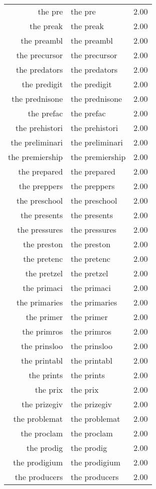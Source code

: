 \begin{table}[ht]
\begin{tabular}{rlr}
  the pre & the pre & 2.00 \\ 
  the preak & the preak & 2.00 \\ 
  the preambl & the preambl & 2.00 \\ 
  the precursor & the precursor & 2.00 \\ 
  the predators & the predators & 2.00 \\ 
  the predigit & the predigit & 2.00 \\ 
  the prednisone & the prednisone & 2.00 \\ 
  the prefac & the prefac & 2.00 \\ 
  the prehistori & the prehistori & 2.00 \\ 
  the preliminari & the preliminari & 2.00 \\ 
  the premiership & the premiership & 2.00 \\ 
  the prepared & the prepared & 2.00 \\ 
  the preppers & the preppers & 2.00 \\ 
  the preschool & the preschool & 2.00 \\ 
  the presents & the presents & 2.00 \\ 
  the pressures & the pressures & 2.00 \\ 
  the preston & the preston & 2.00 \\ 
  the pretenc & the pretenc & 2.00 \\ 
  the pretzel & the pretzel & 2.00 \\ 
  the primaci & the primaci & 2.00 \\ 
  the primaries & the primaries & 2.00 \\ 
  the primer & the primer & 2.00 \\ 
  the primros & the primros & 2.00 \\ 
  the prinsloo & the prinsloo & 2.00 \\ 
  the printabl & the printabl & 2.00 \\ 
  the prints & the prints & 2.00 \\ 
  the prix & the prix & 2.00 \\ 
  the prizegiv & the prizegiv & 2.00 \\ 
  the problemat & the problemat & 2.00 \\ 
  the proclam & the proclam & 2.00 \\ 
  the prodig & the prodig & 2.00 \\ 
  the prodigium & the prodigium & 2.00 \\ 
  the producers & the producers & 2.00 \\ 

\end{tabular}
\end{table}
